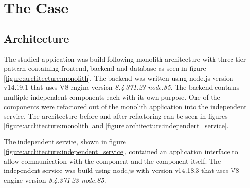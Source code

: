 \chapter{The Case\label{case}}

\section{Architecture}
The studied application was build following monolith architecture with three tier pattern containing frontend, backend and database as seen in figure \ref{figure:architecture:monolith}.
The backend was written using node.js version v14.19.1 that uses V8 engine version \textit{8.4.371.23-node.85}.
The backend contains multiple independent components each with its own purpose.
One of the components were refactored out of the monolith application into the independent service.
The architecture before and after refactoring can be seen in figures \ref{figure:architecture:monolith} and \ref{figure:architecture:independent_service}.

The independent service, shown in figure \ref{figure:architecture:independent_service}, contained an application interface to allow communication with the component and the component itself.
The independent service was build using node.js with version v14.18.3 that uses V8 engine version \textit{8.4.371.23-node.85}.

